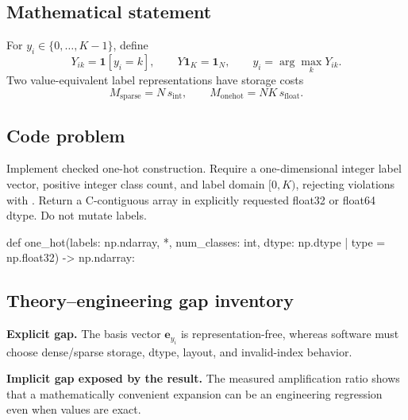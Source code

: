 
        \subsection{Mathematical statement}


For $y_i\in\{0,\ldots,K-1\}$, define
\[
  Y_{ik}=\mathbf 1[y_i=k],\qquad
  Y\bm 1_K=\bm 1_N,\qquad
  y_i=\arg\max_kY_{ik}.
\]
Two value-equivalent label representations have storage costs
\[
  M_{\mathrm{sparse}}=N\,s_{\mathrm{int}},\qquad
  M_{\mathrm{onehot}}=NK\,s_{\mathrm{float}}.
\]


        \subsection{Code problem}


Implement checked one-hot construction.  Require a one-dimensional integer
label vector, positive integer class count, and label domain $[0,K)$, rejecting
violations with .  Return a
C-contiguous array in explicitly requested float32 or float64 dtype.  Do not
mutate labels.


        \begin{contractbox}
        \begin{Code}
        def one_hot(labels: np.ndarray, *, num_classes: int, dtype: np.dtype | type = np.float32) -> np.ndarray:
        \end{Code}
        \end{contractbox}

        \subsection{Theory--engineering gap inventory}

        \begin{gapbox}
        \textbf{Explicit gap.} The basis vector $\bm e_{y_i}$ is representation-free, whereas software must choose dense/sparse storage, dtype, layout, and invalid-index behavior.

        \textbf{Implicit gap exposed by the result.} The measured amplification ratio shows that a mathematically convenient expansion can be an engineering regression even when values are exact.
        \end{gapbox}

